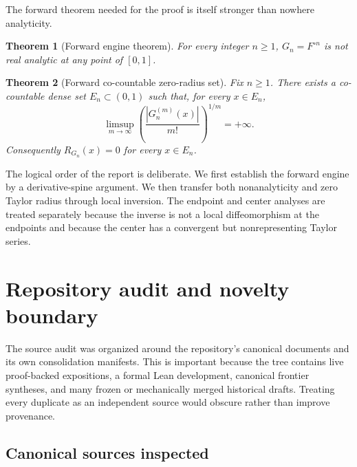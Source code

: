 \documentclass[11pt,oneside]{article}
\newtheorem{theorem}{Theorem}[section]
\theoremstyle{definition}
\theoremstyle{remark}
\newcommand{\comp}{\mathbin{\circ}}
\begin{document}
The forward theorem needed for the proof is itself stronger than nowhere analyticity.

\begin{theorem}[Forward engine theorem]
\label{thm:main}
For every integer $n\geq1$, $G_n=F^{\comp n}$ is not real analytic at any point of
$[0,1]$.
\end{theorem}

\begin{theorem}[Forward co-countable zero-radius set]
\label{thm:strong}
Fix $n\geq1$.  There exists a co-countable dense set $E_n\subset(0,1)$ such that, for
every $x\in E_n$,
\begin{equation}
 \limsup_{m\to\infty}
 \left(\frac{|G_n^{(m)}(x)|}{m!}\right)^{1/m}=+\infty.
 \label{eq:infinite-limsup}
\end{equation}
Consequently $R_{G_n}(x)=0$ for every $x\in E_n$.
\end{theorem}

The logical order of the report is deliberate.  We first establish the forward engine
by a derivative-spine argument.  We then transfer both nonanalyticity and zero Taylor
radius through local inversion.  The endpoint and center analyses are treated
separately because the inverse is not a local diffeomorphism at the endpoints and
because the center has a convergent but nonrepresenting Taylor series.

\section{Repository audit and novelty boundary}
\label{sec:audit}

The source audit was organized around the repository's canonical documents and its
own consolidation manifests.  This is important because the tree contains live
proof-backed expositions, a formal Lean development, canonical frontier syntheses,
and many frozen or mechanically merged historical drafts.  Treating every duplicate
as an independent source would obscure rather than improve provenance.

\subsection{Canonical sources inspected}
\end{document}
